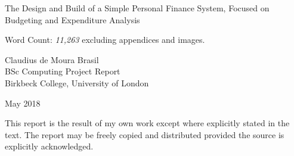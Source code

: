 \begin{titlepage}
  \center
  
  \vspace*{3cm}

  {
    \begin{spacing}{1.2}
      \LARGE The Design and Build of a Simple Personal Finance System, Focused
      on Budgeting and Expenditure Analysis
    \end{spacing}
  }

  \vfill
  
  Word Count: \emph{11,263} excluding appendices and images.
  
  \vfill

  Claudius de Moura Brasil\\
  BSc Computing Project Report\\
  Birkbeck College, University of London

  May 2018

  This report is the result of my own work except where explicitly stated in
  the text. The report may be freely copied and distributed provided the source
  is explicitly acknowledged.
  
  \vfill

\end{titlepage}

